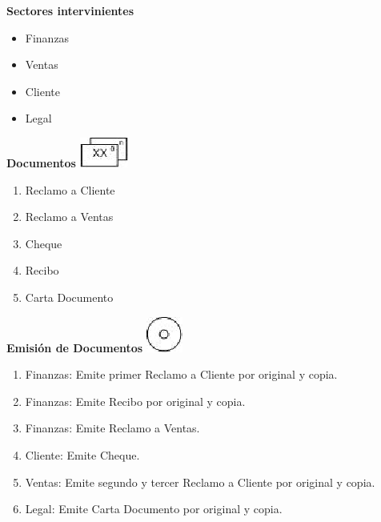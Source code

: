 \begin{center}\textbf{Sectores intervinientes}\end{center}
\begin{itemize}
  \item Finanzas
  \item Ventas
  \item Cliente
  \item Legal
\end{itemize}

\begin{center}
  \textbf{Documentos}
  \includegraphics{./Images/Simbolos/simbolo-Documentos.png}
\end{center}
\begin{enumerate}
\item Reclamo a Cliente
\item Reclamo a Ventas
\item Cheque
\item Recibo
\item Carta Documento
\end{enumerate}

\begin{center}
  \textbf{Emisión de Documentos}
  \includegraphics{./Images/Simbolos/simbolo-Emision-de-Documentos.png}
\end{center}
\begin{enumerate}
\item Finanzas: Emite primer Reclamo a Cliente por original y copia.
\item Finanzas: Emite Recibo por original y copia.
\item Finanzas: Emite Reclamo a Ventas.
\item Cliente: Emite Cheque.
\item Ventas: Emite segundo y tercer Reclamo a Cliente por original y copia.
\item Legal: Emite Carta Documento por original y copia.
\end{enumerate}

